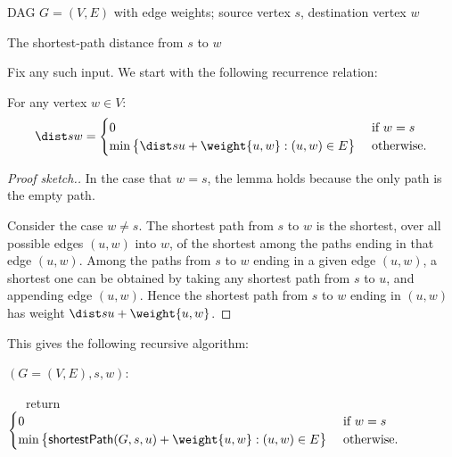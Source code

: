 \begin{mylist}
\item[\bf input:]
  DAG $G=(V,E)$ with edge weights; source vertex $s$, destination vertex $w$

\item[\bf output:]
  The shortest-path distance from $s$ to $w$
\end{mylist}
  
Fix any such input.
We start with the following recurrence relation:
\begin{lemma}\label{dp: lemma: DAGs} 
  For any vertex $w\in V$:
  \[
  \dist s w = \begin{cases}
    0 & \text{ if } w = s \\
    \min \big\{ \dist s u + \weight {u,w} : (u, w)\in E\big\}  & \text{ otherwise.}
  \end{cases}
  \]
\end{lemma}
\begin{proof}[Proof sketch.]
  In the case that $w=s$, the lemma holds because the only path is the empty path.

  Consider the case $w\ne s$.
  The shortest path from $s$ to $w$ is the shortest,
  over all possible edges $(u, w)$ into $w$,
  of the shortest among the paths ending in that edge $(u,w)$.
  Among the paths from $s$ to $w$ ending in a given edge $(u, w)$,
  a shortest one can be obtained by taking any shortest path from $s$ to $u$, and appending edge $(u,w)$.
  Hence the shortest path from $s$ to $w$ ending in $(u,w)$
  has weight $\dist s u  + \weight {u, w}$.
\end{proof}

This gives the following recursive algorithm:

\begin{myframed}
  \begin{steps}
  \item[]\shortestPath$(G=(V,E), s, w)$:

    \step~~~return
    \(\begin{cases}
      0 & \text{ if } w = s \\
      \min \big\{ \shortestPath(G, s, u) + \weight {u,w}: (u, w)\in E\big\}  & \text{ otherwise.}
    \end{cases}\)
  \end{steps}
\end{myframed}

